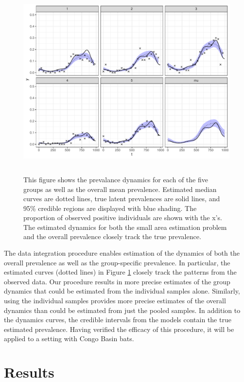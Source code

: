\documentclass{article}
\begin{document}
\begin{figure}[ht!]
\centerline{\includegraphics[width=500pt,height=283pt]{Figure5.pdf}}
\caption{This figure shows the prevalance dynamics for each of the five groups as well as the overall mean prevalence. Estimated median curves are dotted lines, true latent prevalences are solid lines, and 95\% credible regions are displayed with blue shading. The proportion of observed positive individuals are shown with the x's. The estimated dynamics for both the small area estimation problem and the overall prevalence closely track the true prevalence. \label{syn3}}
\end{figure}

The data integration procedure enables estimation of the dynamics of both the overall prevalence as well as the group-specific prevalence. In particular, the estimated curves (dotted lines) in Figure \ref{syn3} closely track the patterns from the observed data. Our procedure results in more precise estimates of the group dynamics that could be estimated from the individual samples alone. Similarly, using the individual samples provides more precise estimates of the overall dynamics than could be estimated from just the pooled samples. In addition to the dynamics curves, the credible intervals from the models contain the true estimated prevalence. Having verified the efficacy of this procedure, it will be applied to a setting with Congo Basin bats.

\section{Results}
\end{document}
